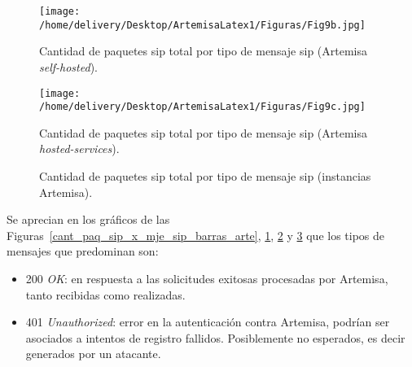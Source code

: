 \documentclass[a4paper,12pt]{report}
\begin{document}
{\clearpage

\begin{figure}[h!] 
\centering
\texttt{[image: /home/delivery/Desktop/ArtemisaLatex1/Figuras/Fig9b.jpg]}
\caption{Cantidad de paquetes \ac{sip} total por tipo de mensaje \ac{sip}
(Artemisa \emph{self-hosted}).}
\label{cant_paq_sip_x_mje_sip_barras_arte_sh}
\end{figure}

\begin{figure}[h!] 
\centering
\texttt{[image: /home/delivery/Desktop/ArtemisaLatex1/Figuras/Fig9c.jpg]}
\caption{Cantidad de paquetes \ac{sip} total por tipo de mensaje \ac{sip}
(Artemisa \emph{hosted-services}).}
\label{cant_paq_sip_x_mje_sip_barras_arte_hs}
\end{figure}

\clearpage

\begin{figure}[h!]
 \centering
 \caption{Cantidad de paquetes \ac{sip} total por tipo de mensaje \ac{sip}
(instancias Artemisa).}
\label{cant_paq_sip_x_mje_sip_torta_arte}
\end{figure}


Se aprecian en los gráficos de las Figuras~\ref{cant_paq_sip_x_mje_sip_barras_arte}, \ref{cant_paq_sip_x_mje_sip_barras_arte_sh},
\ref{cant_paq_sip_x_mje_sip_barras_arte_hs} y \ref{cant_paq_sip_x_mje_sip_torta_arte} que los tipos de mensajes que
predominan son:

\begin{itemize}
\item 200 \emph{OK}: en respuesta a las solicitudes exitosas procesadas por
Artemisa, tanto recibidas como realizadas.

\item 401 \emph{Unauthorized}: error en la autenticación contra Artemisa,
podrían ser asociados a intentos de registro fallidos. Posiblemente no
esperados, es decir generados por un atacante.


\end{itemize}}
\end{document}
